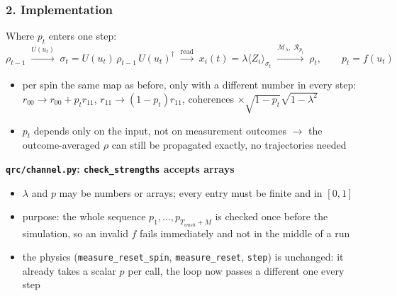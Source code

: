 \subsubsection*{2. Implementation}
\label{sec:rq2-implementation}
Where $p_t$ enters one step:
\begin{equation*}
    \rho_{t-1} \;\xrightarrow{U(u_t)}\; \sigma_t = U(u_t)\,\rho_{t-1}\,U(u_t)^\dagger
    \;\xrightarrow{\text{read}}\; x_i(t) = \lambda \langle Z_i \rangle_{\sigma_t}
    \;\xrightarrow{\mathcal{M}_\lambda,\; \mathcal{R}_{p_t}}\; \rho_t, \qquad p_t = f(u_t)
\end{equation*}
\begin{itemize}
    \item per spin the same map as before, only with a different number in every step:
    $r_{00} \to r_{00} + p_t r_{11}$, $r_{11} \to (1-p_t) r_{11}$, coherences $\times \sqrt{1-p_t}\sqrt{1-\lambda^2}$
    \item $p_t$ depends only on the input, not on measurement outcomes $\to$ the outcome-averaged $\rho$ can still
    be propagated exactly, no trajectories needed
\end{itemize}

\textbf{\texttt{qrc/channel.py}: \texttt{check\_strengths} accepts arrays}
\begin{itemize}
    \item $\lambda$ and $p$ may be numbers or arrays; every entry must be finite and in $[0, 1]$
    \item purpose: the whole sequence $p_1, \ldots, p_{T_{wash}+M}$ is checked once before the simulation,
    so an invalid $f$ fails immediately and not in the middle of a run
    \item the physics (\texttt{measure\_reset\_spin}, \texttt{measure\_reset}, \texttt{step}) is unchanged: it already
    takes a scalar $p$ per call, the loop now passes a different one every step
\end{itemize}

